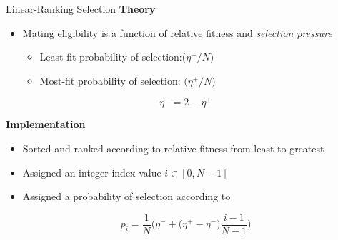 \documentclass[
	style=aggie,
	mode=present,
	size=10pt,
	paper=screen,
	orient=landscape,
	display=slides,
]{powerdot}
\begin{document}
%
%

\begin{slide}[toc=Selection,bm=Selection]{Linear-Ranking Selection}
	\vfill
	\textbf{Theory}
	\begin{itemize}
 		\item Mating eligibility is a function of relative fitness and \textit{selection
		pressure}
		\vfill
		\begin{itemize}
			\item Least-fit probability of selection:$\bigl(\eta^{-}/N\bigr)$ 
			\vfill
			\item Most-fit probability of selection: $\bigl(\eta^{+}/N\bigr)$
		\end{itemize}
	\end{itemize}
	$$\eta^{-}=2-\eta^{+}$$
	\vfill

	\textbf{Implementation}
	\begin{itemize}
		\item Sorted and ranked according to relative fitness from least to greatest
		\vfill
		\item Assigned an integer index value $i\in[0,N-1]$
		\vfill
		\item Assigned a probability of selection according to
		\vfill
	\end{itemize}
 	\begin{equation*}
		p_{i}=\frac{1}{N}\biggl(\eta^{-}+\bigl(\eta^{+}-\eta^{-}\bigr)
		\frac{i-1}{N-1}\biggr)
	\end{equation*}
	\vfill \strut
\end{slide}
\end{document}
